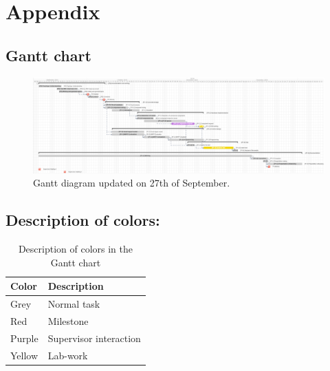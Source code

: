 \chapter{Appendix}



\clearpage

\addtolength{\hoffset}{-4.0cm}
\recalctypearea


\section{Gantt chart}


\vspace{1cm}
\begin{figure}[htbp]
	\begin{center}
		\includegraphics[width=1.3\textwidth]{../Pictures/Gantt_diagram_without_left_panel}
		\caption{Gantt diagram updated on 27th of September.}
		\label{gantt}
	\end{center}	
\end{figure}


\section*{Description of colors:}


\begin{table}[H]
	\centering
	\begin{tabular}{|p{3cm}|p{6cm}|} 
		\hline
		\textbf{Color} & \textbf{Description} \\ \hline
		Grey & Normal task  \\ \hline
		Red & Milestone  \\ \hline
		Purple & Supervisor interaction  \\ \hline
		Yellow &  Lab-work\\ \hline
	\end{tabular}
	\caption{Description of colors in the Gantt chart}
	\label{gantt_colors}
\end{table}

\clearpage
\addtolength{\hoffset}{4.0cm}
\recalctypearea


